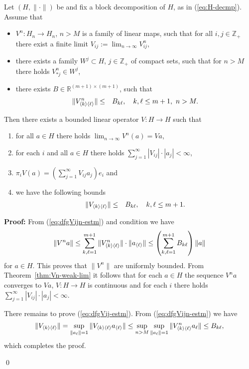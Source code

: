 \begin{theorem}
\label{thm:gcpn-abstr}
Let $(H,\|\cdot\|)$ be \gss and fix a block decomposition of $H$, as in (\ref{eq:H-decmp}). Assume that
\begin{itemize}
\item $V^n:H_n \to H_n$, $n>M$ is a family of linear maps, such that for all $i,j \in \mathbb{Z}_+$ there exist a finite limit
$V_{ij}:=\lim_{n\to \infty} V^n_{ij}$, %
\item there exists a family $W^j\subset H$, $j\in\mathbb Z_+$ of compact sets, such that for $n>M$ there holds
 $V^n_{\ast j} \in W^j$,%
\item there exists $B \in \mathbb{R}^{(m+1) \times (m+1)}$, such that
      \begin{eqnarray}
       \|V^n_{\langle k \rangle \langle \ell \rangle}\| &\leq& B_{k\ell}, \quad k,\ell \leq m+1,\ n>M.  \label{eq:dfgVijn-estm}
      \end{eqnarray}
\end{itemize}
Then  there exists a bounded linear operator $V: H \to H$ such that
\begin{enumerate}
\item  for all $a \in H$ there holds $\lim_{n \to \infty} V^n(a)=Va$,
\item  for each $i$ and all $a \in H$ there holds $\sum_{j=1}^\infty |V_{ij}| \cdot |a_j| < \infty$,
\item  $\pi_i V(a) =  \left(\sum_{j=1}^\infty  V_{ij} a_j\right) e_i$ and
\item we have the following bounds
       \begin{eqnarray}
        \|V_{\langle k \rangle \langle \ell \rangle}\| &\leq& B_{k\ell}, \quad k,\ell \leq m+1.  \label{eq:dfgVij-estm}
      \end{eqnarray}
\end{enumerate}
\end{theorem}
\noindent
\textbf{Proof:}
From (\ref{eq:dfgVijn-estm}) and condition  we have
\begin{eqnarray*}
  \|V^n a\|  \leq \sum_{k,\ell=1}^{m+1} \|V^n_{\langle k \rangle \langle \ell \rangle}\| \cdot \|a_{\langle \ell \rangle}\| \leq  \left(\sum_{k,\ell=1}^{m+1} B_{k\ell}\right) \|a\|
\end{eqnarray*}
for $a \in H$. This proves that $\|V^n\|$ are uniformly bounded. From Theorem~\ref{thm:Vn-weak-lim} it follows that for each $a \in H$ the sequence $V^n a$ converges to $Va$, $V:H \to H$ is continuous and for each $i$ there holds  $\sum_{j=1}^\infty |V_{ij}| \cdot |a_j| < \infty$.

There remains to prove (\ref{eq:dfgVij-estm}). From (\ref{eq:dfgVijn-estm}) we have
$$
\|V_{\langle k \rangle \langle \ell \rangle}\| = \sup_{\|a_\ell\|=1}\|V_{\langle k \rangle \langle \ell \rangle}a_{\langle \ell \rangle}\|\leq \sup_{n>M}\sup_{\|a_\ell\|=1}\|V^n_{\langle k \rangle \langle \ell \rangle}a_\ell\|\leq B_{k\ell},
$$
which completes the proof.

\qed


